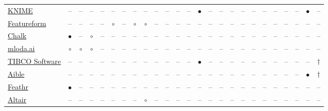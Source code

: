 {\begin{longtable}{@{}p{3.1cm} *{24}{c} @{}}
\raggedright \href{https://www.knime.com/}{KNIME} & -- & -- & -- & -- & -- & -- & -- & -- & -- & -- & -- & -- & \href{https://www.knime.com/blog/put-scalable-AI-Agents-into-production-with-the-MCP-standard-and-KNIME}{$\bullet$} & -- & -- & -- & -- & -- & -- & -- & -- & -- & \href{https://www.knime.com/key-capabilities/ai-agents}{$\bullet$} & -- \\
\raggedright \href{https://www.featureform.com/}{Featureform} & -- & -- & -- & -- & \href{https://docs.featureform.com/getting-started/architecture-and-components#dashboard-/-cli}{$\circ$} & -- & \href{https://docs.featureform.com/getting-started/architecture-and-components#dashboard-/-cli}{$\circ$} & \href{https://docs.featureform.com/getting-started/architecture-and-components#dashboard-/-cli}{$\circ$} & -- & -- & -- & -- & -- & -- & -- & -- & -- & -- & -- & -- & -- & -- & -- & -- \\
\raggedright \href{https://chalk.ai/}{Chalk} & \href{https://docs.chalk.ai/api-docs}{$\bullet$} & -- & \href{https://docs.chalk.ai/api-docs}{$\circ$} & -- & -- & -- & -- & -- & -- & -- & -- & -- & -- & -- & -- & -- & -- & -- & -- & -- & -- & -- & -- & -- \\
\raggedright \href{http://mloda.ai/}{mloda.ai} & \href{https://pypi.org/project/mloda/}{$\circ$} & \href{https://pypi.org/project/mloda/}{$\circ$} & \href{https://pypi.org/project/mloda/}{$\circ$} & -- & -- & -- & -- & -- & -- & -- & -- & -- & -- & -- & -- & -- & -- & -- & -- & -- & -- & -- & -- & -- \\
\raggedright \href{https://www.tibco.com/}{TIBCO Software} & -- & -- & -- & -- & -- & -- & -- & -- & -- & -- & -- & -- & \href{https://www.tibco.com/ai-legal-disclaimer}{$\bullet$} & -- & -- & -- & -- & -- & -- & -- & -- & -- & -- & \href{https://www.tibco.com/ai-legal-disclaimer}{$\dagger$} \\
\raggedright \href{https://www.aible.com/}{Aible} & -- & -- & -- & -- & -- & -- & -- & -- & -- & -- & -- & -- & -- & -- & -- & -- & -- & -- & -- & -- & -- & -- & \href{https://enaible.aible.com/hubfs/Aible\%20Overview_Nov_2025.pdf}{$\bullet$} & \href{https://enaible.aible.com/hubfs/Aible\%20Overview_Nov_2025.pdf}{$\dagger$} \\
\raggedright \href{https://github.com/feathr-ai/feathr}{Feathr} & \href{https://pypi.org/project/feathr/}{$\bullet$} & -- & -- & -- & -- & -- & -- & -- & -- & -- & -- & -- & -- & -- & -- & -- & -- & -- & -- & -- & -- & -- & -- & -- \\
\raggedright \href{https://altair.com/}{Altair} & -- & -- & -- & -- & -- & -- & -- & \href{https://help.altair.com/accelerator/html/bookshelf/topics/ft/tut_cli.html}{$\circ$} & -- & -- & -- & -- & -- & -- & -- & -- & -- & -- & -- & -- & -- & -- & -- & -- \\

\end{longtable}}
